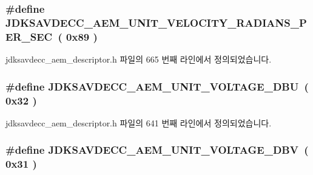 \subsubsection[{\texorpdfstring{J\+D\+K\+S\+A\+V\+D\+E\+C\+C\+\_\+\+A\+E\+M\+\_\+\+U\+N\+I\+T\+\_\+\+V\+E\+L\+O\+C\+I\+T\+Y\+\_\+\+R\+A\+D\+I\+A\+N\+S\+\_\+\+P\+E\+R\+\_\+\+S\+EC}{JDKSAVDECC_AEM_UNIT_VELOCITY_RADIANS_PER_SEC}}]{\setlength{\rightskip}{0pt plus 5cm}\#define J\+D\+K\+S\+A\+V\+D\+E\+C\+C\+\_\+\+A\+E\+M\+\_\+\+U\+N\+I\+T\+\_\+\+V\+E\+L\+O\+C\+I\+T\+Y\+\_\+\+R\+A\+D\+I\+A\+N\+S\+\_\+\+P\+E\+R\+\_\+\+S\+EC~( 0x89 )}\hypertarget{group__units_ga1cc71bb4e432deb1c4ae46a0d8102122}{}\label{group__units_ga1cc71bb4e432deb1c4ae46a0d8102122}


jdksavdecc\+\_\+aem\+\_\+descriptor.\+h 파일의 665 번째 라인에서 정의되었습니다.

\subsubsection[{\texorpdfstring{J\+D\+K\+S\+A\+V\+D\+E\+C\+C\+\_\+\+A\+E\+M\+\_\+\+U\+N\+I\+T\+\_\+\+V\+O\+L\+T\+A\+G\+E\+\_\+\+D\+BU}{JDKSAVDECC_AEM_UNIT_VOLTAGE_DBU}}]{\setlength{\rightskip}{0pt plus 5cm}\#define J\+D\+K\+S\+A\+V\+D\+E\+C\+C\+\_\+\+A\+E\+M\+\_\+\+U\+N\+I\+T\+\_\+\+V\+O\+L\+T\+A\+G\+E\+\_\+\+D\+BU~( 0x32 )}\hypertarget{group__units_ga2590a6d5cc91fee7a48b207094b3492d}{}\label{group__units_ga2590a6d5cc91fee7a48b207094b3492d}


jdksavdecc\+\_\+aem\+\_\+descriptor.\+h 파일의 641 번째 라인에서 정의되었습니다.

\subsubsection[{\texorpdfstring{J\+D\+K\+S\+A\+V\+D\+E\+C\+C\+\_\+\+A\+E\+M\+\_\+\+U\+N\+I\+T\+\_\+\+V\+O\+L\+T\+A\+G\+E\+\_\+\+D\+BV}{JDKSAVDECC_AEM_UNIT_VOLTAGE_DBV}}]{\setlength{\rightskip}{0pt plus 5cm}\#define J\+D\+K\+S\+A\+V\+D\+E\+C\+C\+\_\+\+A\+E\+M\+\_\+\+U\+N\+I\+T\+\_\+\+V\+O\+L\+T\+A\+G\+E\+\_\+\+D\+BV~( 0x31 )}\hypertarget{group__units_gaeef7e5d4991eb001da8792bb71b2fd18}{}\label{group__units_gaeef7e5d4991eb001da8792bb71b2fd18}


